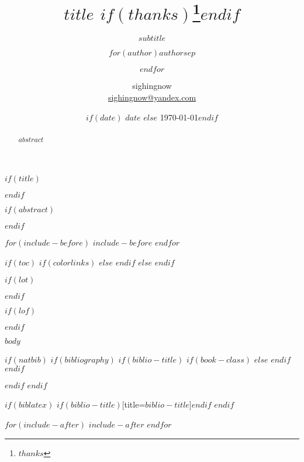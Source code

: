 \documentclass[$if(fontsize)$$fontsize$,$endif$$if(lang)$$babel-lang$,$endif$$if(papersize)$$papersize$paper,$endif$$for(classoption)$$classoption$$sep$,$endfor$]{report} %
\title{\huge $title$ $if(thanks)$\thanks{$thanks$}$endif$}
\subtitle{$subtitle$}
\author{$for(author)$$author$$sep$ \and $endfor$}
\author{sighingnow \\ \href{mailto:sighingnow@yandex.com}{sighingnow@yandex.com}}
\institute{$for(institute)$$institute$$sep$ \and $endfor$}
\date{$if(date)$ $date$ $else$ \today $endif$}
\begin{document}
$if(title)$
    \maketitle
$endif$

$if(abstract)$
    \begin{abstract}
    $abstract$
    \end{abstract}
$endif$

$for(include-before)$
    $include-before$
$endfor$

$if(toc)$
{
    $if(colorlinks)$
        \hypersetup{linkcolor=$if(toccolor)$$toccolor$$else$black$endif$}
    $else$
        \hypersetup{colorlinks=true,linktoc=all,linkcolor=black}
    $endif$
    \setcounter{tocdepth}{$toc-depth$}
    \tableofcontents
}
$else$
    \tableofcontents
$endif$

$if(lot)$
    \listoftables
$endif$

$if(lof)$
    \listoffigures
$endif$

$body$

$if(natbib)$
    $if(bibliography)$
        $if(biblio-title)$
            $if(book-class)$
                \renewcommand\bibname{$biblio-title$}
            $else$
                \renewcommand\refname{$biblio-title$}
            $endif$
        $endif$
        
    $endif$
$endif$

$if(biblatex)$
    \printbibliography$if(biblio-title)$[title=$biblio-title$]$endif$
$endif$

$for(include-after)$
    $include-after$
$endfor$
\end{document}
